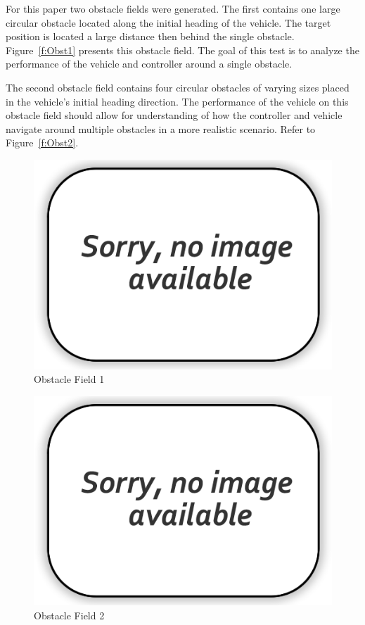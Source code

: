 \documentclass[12pt,twocolumn]{article}
\begin{document}
For this paper two obstacle fields were generated. The first contains one large circular obstacle located along the initial heading of the vehicle. The target position is located a large distance then behind the single obstacle. Figure~\ref{f:Obst1} presents this obstacle field. The goal of this test is to analyze the performance of the vehicle and controller around a single obstacle. 

The second obstacle field contains four circular obstacles of varying sizes placed in the vehicle’s initial heading direction. The performance of the vehicle on this obstacle field should allow for understanding of how the controller and vehicle navigate around multiple obstacles in a more realistic scenario. Refer to Figure~\ref{f:Obst2}.

\begin{figure}
	\centering
	\includegraphics[width=\columnwidth]{Figs/no-image.png}
	\caption{\small Obstacle Field 1}  
	\label{fig:Obst1}
\end{figure}

\begin{figure}
	\centering
	\includegraphics[width=\columnwidth]{Figs/no-image.png}
	\caption{\small Obstacle Field 2}   
	\label{fig:Obst2}
\end{figure}
\end{document}
